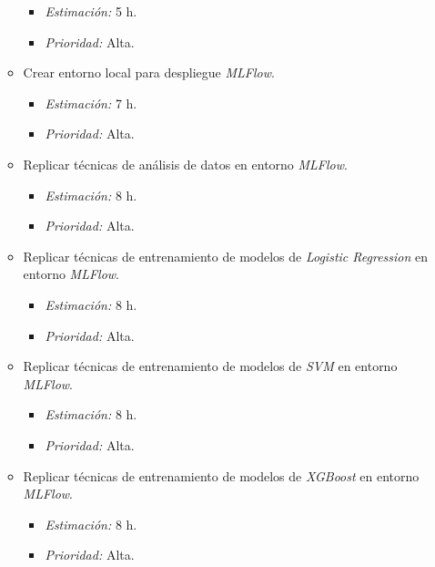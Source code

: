 \documentclass[
11pt, %
]{charter}
\begin{document}
\begin{itemize}
\begin{itemize}
                \begin{itemize}
                    \item \textit{Estimación:} 5 h.
                    \item \textit{Prioridad:} Alta.
                \end{itemize}
            \item Crear entorno local para despliegue \textit{MLFlow}.
                \begin{itemize}
                    \item \textit{Estimación:} 7 h.
                    \item \textit{Prioridad:} Alta.
                \end{itemize}
             \item Replicar técnicas de análisis de datos en entorno \textit{MLFlow}.
                \begin{itemize}
                    \item \textit{Estimación:} 8 h.
                    \item \textit{Prioridad:} Alta.
                \end{itemize}
            \item Replicar técnicas de entrenamiento de modelos de \textit{Logistic Regression} en entorno \textit{MLFlow}.
                \begin{itemize}
                    \item \textit{Estimación:} 8 h.
                    \item \textit{Prioridad:} Alta.
                \end{itemize}
            \item Replicar técnicas de entrenamiento de modelos de \textit{SVM} en entorno \textit{MLFlow}.
                \begin{itemize}
                    \item \textit{Estimación:} 8 h.
                    \item \textit{Prioridad:} Alta.
                \end{itemize}
            \item Replicar técnicas de entrenamiento de modelos de \textit{XGBoost} en entorno \textit{MLFlow}.
                \begin{itemize}
                    \item \textit{Estimación:} 8 h.
                    \item \textit{Prioridad:} Alta.
                \end{itemize}

\end{itemize}
\end{itemize}
\end{document}
